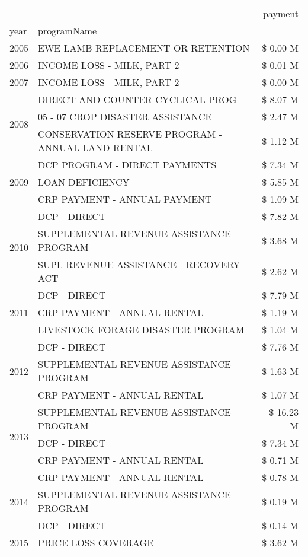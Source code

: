 \begin{tabular}{llr}
\toprule
 &  & payment \\
year & programName &  \\
\midrule
2005 & EWE LAMB REPLACEMENT OR RETENTION & \$ 0.00 M \\
\cline{1-3}
2006 & INCOME LOSS - MILK, PART 2 & \$ 0.01 M \\
\cline{1-3}
2007 & INCOME LOSS - MILK, PART 2 & \$ 0.00 M \\
\cline{1-3}
\multirow[t]{3}{*}{2008} & DIRECT AND COUNTER CYCLICAL PROG & \$ 8.07 M \\
 & 05 - 07 CROP DISASTER ASSISTANCE & \$ 2.47 M \\
 & CONSERVATION RESERVE PROGRAM - ANNUAL LAND RENTAL & \$ 1.12 M \\
\cline{1-3}
\multirow[t]{3}{*}{2009} & DCP PROGRAM - DIRECT PAYMENTS & \$ 7.34 M \\
 & LOAN DEFICIENCY & \$ 5.85 M \\
 & CRP PAYMENT - ANNUAL PAYMENT & \$ 1.09 M \\
\cline{1-3}
\multirow[t]{3}{*}{2010} & DCP - DIRECT & \$ 7.82 M \\
 & SUPPLEMENTAL REVENUE ASSISTANCE PROGRAM & \$ 3.68 M \\
 & SUPL REVENUE ASSISTANCE - RECOVERY ACT & \$ 2.62 M \\
\cline{1-3}
\multirow[t]{3}{*}{2011} & DCP - DIRECT & \$ 7.79 M \\
 & CRP PAYMENT - ANNUAL RENTAL & \$ 1.19 M \\
 & LIVESTOCK FORAGE DISASTER PROGRAM & \$ 1.04 M \\
\cline{1-3}
\multirow[t]{3}{*}{2012} & DCP - DIRECT & \$ 7.76 M \\
 & SUPPLEMENTAL REVENUE ASSISTANCE PROGRAM & \$ 1.63 M \\
 & CRP PAYMENT - ANNUAL RENTAL & \$ 1.07 M \\
\cline{1-3}
\multirow[t]{3}{*}{2013} & SUPPLEMENTAL REVENUE ASSISTANCE PROGRAM & \$ 16.23 M \\
 & DCP - DIRECT & \$ 7.34 M \\
 & CRP PAYMENT - ANNUAL RENTAL & \$ 0.71 M \\
\cline{1-3}
\multirow[t]{3}{*}{2014} & CRP PAYMENT - ANNUAL RENTAL & \$ 0.78 M \\
 & SUPPLEMENTAL REVENUE ASSISTANCE PROGRAM & \$ 0.19 M \\
 & DCP - DIRECT & \$ 0.14 M \\
\cline{1-3}
\multirow[t]{3}{*}{2015} & PRICE LOSS COVERAGE & \$ 3.62 M \\

\end{tabular}

